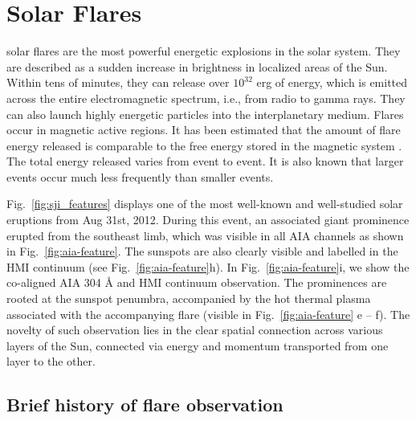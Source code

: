 \section{Solar Flares}\label{sol_flr}

solar flares are the most powerful energetic explosions in the solar system. They are described as a sudden increase in brightness in localized areas of the Sun. Within tens of minutes, they can release over $10^{32}$ erg of energy, which is emitted across the entire electromagnetic spectrum, i.e., from radio to gamma rays. They can also launch highly energetic particles into the interplanetary medium. Flares occur in magnetic active regions. It has been estimated that the amount of flare energy released is comparable to the free energy stored in the magnetic system \citep{emslie12,ash17}. The total energy released varies from event to event. It is also known that larger events occur much less frequently than smaller events.

Fig.~\ref{fig:sji_features} displays one of the most well-known and well-studied solar eruptions from Aug 31st, 2012. During this event, an associated giant prominence erupted from the southeast limb, which was visible in all AIA channels as shown in Fig.~\ref{fig:aia-feature}. The sunspots are also clearly visible and labelled in the HMI continuum (see Fig.~\ref{fig:aia-feature}h). In Fig.~\ref{fig:aia-feature}i, we show the co-aligned AIA 304 {\AA} and HMI continuum observation. The prominences are rooted at the sunspot penumbra, accompanied by the hot thermal plasma associated with the accompanying flare (visible in Fig.~\ref{fig:aia-feature} e {--} f). The novelty of such observation lies in the clear spatial connection across various layers of the Sun, connected via energy and momentum transported from one layer to the other.

\subsection{Brief history of flare observation}\label{sol_flr_1}

